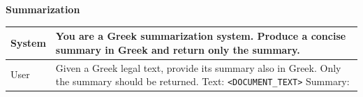 \documentclass[sigconf,review,anonymous]{acmart}
\begin{document}
\begin{center}
\textbf{Summarization}\par\smallskip
\small
\begin{tabularx}{\columnwidth}{p{}X}
\toprule
System & You are a Greek summarization system. Produce a concise summary in Greek and return only the summary. \\
\midrule
User & Given a Greek legal text, provide its summary also in Greek. Only the summary should be returned. \newline
Text: \texttt{<DOCUMENT\_TEXT>} \newline
Summary: \\
\bottomrule
\end{tabularx}
\end{center}
\end{document}
